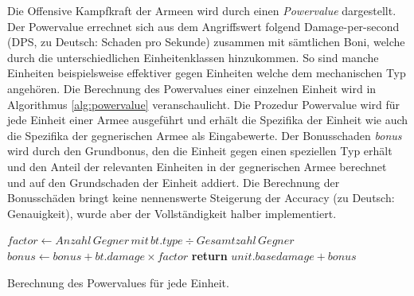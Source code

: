 Die Offensive Kampfkraft der Armeen wird durch einen \textit{Powervalue} dargestellt. Der Powervalue errechnet sich aus dem Angriffswert folgend Damage-per-second (DPS, zu Deutsch: Schaden pro Sekunde) zusammen mit sämtlichen Boni, welche durch die unterschiedlichen Einheitenklassen hinzukommen. So sind manche Einheiten beispielsweise effektiver gegen Einheiten welche dem mechanischen Typ angehören. Die Berechnung des Powervalues einer einzelnen Einheit wird in Algorithmus \ref{alg:powervalue} veranschaulicht. Die Prozedur Powervalue wird für jede Einheit einer Armee ausgeführt und erhält die Spezifika der Einheit wie auch die Spezifika der gegnerischen Armee als Eingabewerte. Der Bonusschaden \textit{bonus} wird durch den Grundbonus, den die Einheit gegen einen speziellen Typ erhält und den Anteil der relevanten Einheiten in der gegnerischen Armee berechnet und auf den Grundschaden der Einheit addiert. Die Berechnung der Bonusschäden bringt keine nennenswerte Steigerung der Accuracy (zu Deutsch: Genauigkeit), wurde aber der Vollständigkeit halber implementiert. 


\begin{algorithm}
\begin{algorithmic}[1]
			\State $factor \leftarrow Anzahl\,Gegner\,mit\,bt.type \div Gesamtzahl\,Gegner$
			\State $bonus \leftarrow bonus + bt.damage \times factor$
		\EndIf
	\EndFor
	\State \textbf{return} $ unit.basedamage + bonus$
\EndProcedure
\end{algorithmic}
\caption{Berechnung des Powervalues für jede Einheit.}
\label{alg:powervalue}
\end{algorithm}

